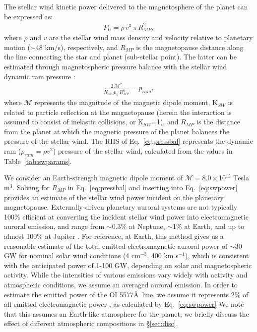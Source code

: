 \documentclass{emulateapj}
\begin{document}
The stellar wind kinetic power delivered to the magnetosphere of the planet can be expressed as:
%
\begin{align}
    P_{U} = \rho\,v^3\,\pi\,R_{MP}^2, \label{eq:swpower}
\end{align}
%
where $\rho$ and $v$ are the stellar wind mass density and velocity relative to planetary motion ($\sim$48 km/s), respectively, and $R_{MP}$ is the magnetopause distance along the line connecting the star and planet (sub-stellar point). The latter can be estimated through magnetospheric pressure balance with the stellar wind dynamic ram pressure \citep[e.g.][]{Schield1969}:
%
\begin{align}
    \frac{2\,\mathcal{M}^2}{K_{SW} \mu_0\,R_{MP}^6} = p_{ram}, \label{eq:pressbal}
\end{align}
%
where $\mathcal{M}$ represents the magnitude of the magnetic dipole moment, K$_{SW}$ is related to particle reflection at the magnetopause (herein the interaction is assumed to consist of inelastic collisions, or K$_{SW}$=1), and $R_{MP}$ is the distance from the planet at which the magnetic pressure of the planet balances the pressure of the stellar wind. The RHS of Eq.~\ref{eq:pressbal} represents the dynamic ram ($p_{ram}=\rho v^2$) pressure of the stellar wind, calculated from the values in Table~\ref{tab:swparams}.

We consider an Earth-strength magnetic dipole moment of $\mathcal{M}=8.0\times$10$^{15}$ Tesla m$^3$. Solving for $R_{MP}$ in Eq.~\ref{eq:pressbal} and inserting into Eq.~\ref{eq:swpower} provides an estimate of the stellar wind power incident on the planetary magnetopause. Externally-driven planetary auroral systems are not typically 100\% efficient at converting the incident stellar wind power into electromagnetic auroral emission, and range from $\sim$0.3\% at Neptune, $\sim$1\% at Earth, and up to almost 100\% at Jupiter \citep[e.g.][]{Cheng1990,Bhardwaj2000}. For reference, at Earth, this method gives us a reasonable estimate of the total emitted electromagnetic auroral power of $\sim$30 GW for nominal solar wind conditions (4 cm$^{-3}$, 400 km s$^{-1}$), which is consistent with the anticipated power of 1-100 GW, depending on solar and magnetospheric activity. While the intensities of various emissions vary widely with activity and atmospheric conditions, we assume an averaged auroral emission. In order to estimate the emitted power of the OI 5577\AA\ line, we assume it represents 2\% of all emitted electromagnetic power \citep{Chamberlain1961,Kivelson1995}, as calculated by Eq.~\ref{eq:swpower} We note that this assumes an Earth-like atmosphere for the planet; we briefly discuss the effect of different atmospheric compositions in \S\ref{sec:disc}.
\end{document}
